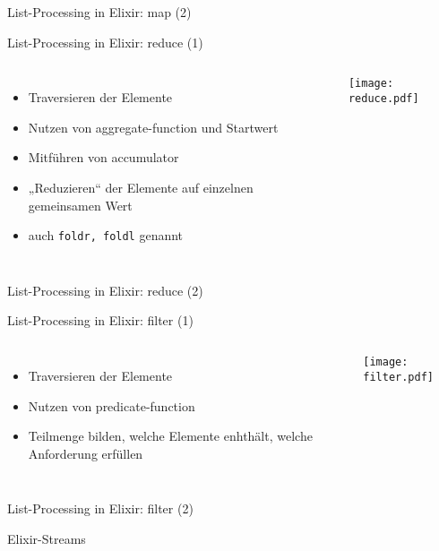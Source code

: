 \documentclass[compress]{beamer}
\begin{document}
  \begin{frame}{List-Processing in Elixir: map (2)}
  \end{frame}

  \begin{frame}{List-Processing in Elixir: reduce (1)}
    \begin{columns}[c]
      \begin{itemize}
        \item Traversieren der Elemente
        \item Nutzen von aggregate-function und Startwert
        \item Mitführen von accumulator
        \item „Reduzieren“ der Elemente auf einzelnen gemeinsamen Wert
        \item auch \texttt{foldr, foldl} genannt
      \end{itemize}
    \texttt{[image: reduce.pdf]}
    \end{columns}
  \end{frame}

  \begin{frame}{List-Processing in Elixir: reduce (2)}
  \end{frame}

  \begin{frame}{List-Processing in Elixir: filter (1)}
    \begin{columns}[c]
      \begin{itemize}
        \item Traversieren der Elemente
        \item Nutzen von predicate-function
        \item Teilmenge bilden, welche Elemente enhthält, welche Anforderung erfüllen
      \end{itemize}
    \texttt{[image: filter.pdf]}
    \end{columns}
  \end{frame}

  \begin{frame}{List-Processing in Elixir: filter (2)}
  \end{frame}

  \begin{frame}{Elixir-Streams}
  \end{frame}
\end{document}
